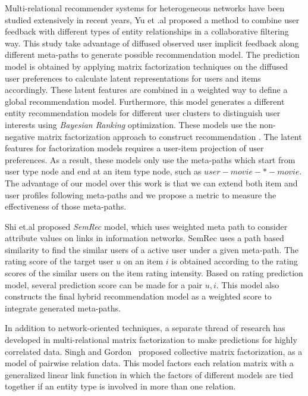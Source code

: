 \documentclass {acmart}
\begin{document}
 Multi-relational recommender systems for heterogeneous networks have been studied extensively in recent years,  Yu et .al  proposed a method \cite{yu2014personalized,yu2013recommendation} to combine user feedback with different types of entity relationships in a collaborative filtering way. This study take advantage of  diffused  observed user implicit feedback along different meta-paths to generate possible recommendation model. The prediction model is obtained by applying matrix factorization techniques on the diffused user preferences to calculate latent representations for users and items accordingly. These latent features are combined  in a weighted way to define a global recommendation model. Furthermore, this model generates a different entity recommendation models for different user clusters  to distinguish user interests using \textit{Bayesian Ranking} optimization. These models use the non-negative matrix factorization approach to construct recommendation \cite{yu2014personalized,yu2013recommendation}. The latent features   for factorization models requires a user-item projection of user preferences. As a result, these models only use the meta-paths which start from user type node and end at an item type node, such as $user-movie-*-movie$. The advantage of our model over this work is that we can extend both item and user profiles following meta-paths and we propose a metric to measure the effectiveness of those meta-paths.


	 
Shi et.al \cite{Shi:2015:SPB:2806416.2806528} proposed  \textit{SemRec} model, which uses weighted meta path to consider attribute values on links in information networks. SemRec uses a path based similarity to find the similar users of a active user under a given meta-path. The rating score of the target user $u$ on an item $i$ is obtained according to the rating scores of the similar users on the item rating intensity.
Based on rating prediction model, several prediction score can be made for a pair $u,i$. This model also constructs the final hybrid recommendation model as a weighted score  to integrate generated meta-paths.

In addition to network-oriented techniques, a separate thread of research has developed in multi-relational matrix factorization to make predictions for highly correlated data. Singh and Gordon~\cite{Singh:2008:RLV:1401890.1401969} proposed collective matrix factorization, as a model of pairwise relation data. This model factors each relation matrix with a generalized linear link function in which the factors of different models are tied together if an entity type is involved in more than one relation.
\end{document}
